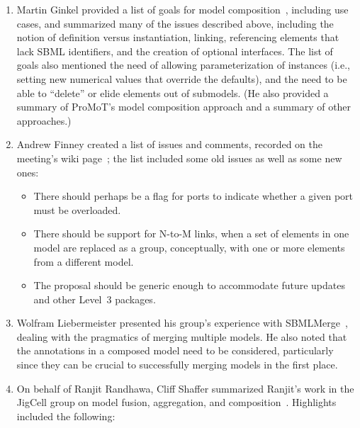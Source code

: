 \begin{enumerate}

\item Martin Ginkel provided a list of goals for model
  composition~\citep{ginkel:2007}, including use cases, and summarized many of the
  issues described above, including the notion of definition versus
  instantiation, linking, referencing elements that lack SBML
  identifiers, and the creation of optional interfaces.  The list of
  goals also mentioned the need of allowing parameterization of
  instances (i.e., setting new numerical values that override the
  defaults), and the need to be able to ``delete'' or elide elements out
  of submodels.  (He also provided a summary of ProMoT's model
  composition approach and a summary of other approaches.)

\item Andrew Finney created a list of issues and comments, recorded on the
  meeting's wiki page~\citep{finney:2007}; the list included some old issues
  as well as some new ones:

  \begin{itemize}

  \item There should perhaps be a flag for ports to indicate whether a
    given port must be overloaded.

  \item There should be support for N-to-M links, when a set of elements
    in one model are replaced as a group, conceptually, with one or more
    elements from a different model.
    
  \item The proposal should be generic enough to accommodate future
    updates and other Level~3 packages.

  \end{itemize}
  
\item Wolfram Liebermeister presented his group's experience with
  SBMLMerge~\citep{liebermeister:2007}, dealing with the pragmatics of
  merging multiple models.  He also noted that the annotations in a
  composed model need to be considered, particularly since they can be
  crucial to successfully merging models in the first place.

\item On behalf of Ranjit Randhawa, Cliff Shaffer summarized Ranjit's
  work in the JigCell group on model fusion, aggregation, and
  composition~\citep{randhawa:2007}.  Highlights included the following:


\end{enumerate}
